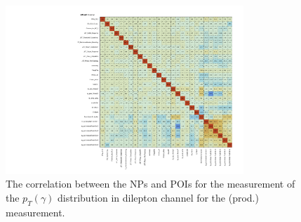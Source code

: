 \begin{figure}[ht]
  \centering
  \includegraphics[width=0.8\textwidth]{figures/diff_xsec/dilep_tty_prod_mu_blinded/correlations/tty2l_pt_all_syst/CorrMatrix.pdf}
  \caption{The correlation between the NPs and POIs for the measurement of 
  the $p_T(\gamma)$ distribution in dilepton channel for the \tty (prod.) measurement.}
  \label{fig:NP-corr_dilep_mu_blinded}
\end{figure}
\FloatBarrier


